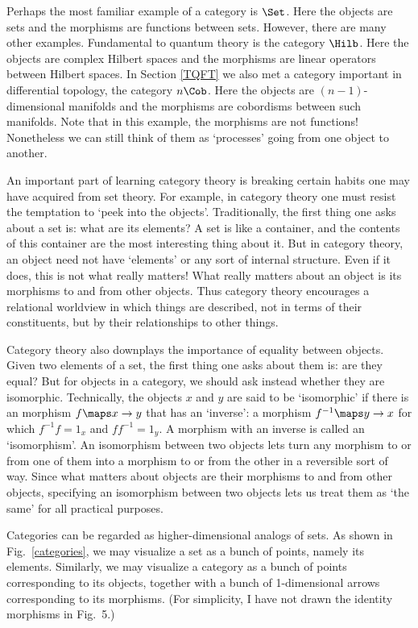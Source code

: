 Perhaps the most familiar example of a category is $\Set$.  Here the
objects are sets and the morphisms are functions between sets.  
However, there are many other examples.  Fundamental to quantum theory
is the category $\Hilb$.  Here the objects are complex Hilbert spaces
and the morphisms are linear operators between Hilbert spaces.  In
Section \ref{TQFT} we also met a category important in differential
topology, the category $n\Cob$.  Here the objects are
$(n-1)$-dimensional manifolds and the morphisms are cobordisms between
such manifolds.  Note that in this example, the morphisms are not
functions!  Nonetheless we can still think of them as `processes' going
from one object to another.  

An important part of learning category theory is breaking certain habits
one may have acquired from set theory.  For example, in category theory
one must resist the temptation to `peek into the objects'.   Traditionally, 
the first thing one asks about a set is: what are its elements?  A set
is like a container, and the contents of this container are the most
interesting thing about it.   But in category theory, an object need not
have `elements' or any sort of internal structure.  Even if it does,
this is not what really matters!   What really matters about an object
is its morphisms to and from other objects.   Thus category theory
encourages a relational worldview in which things are described, not in
terms of their constituents, but by their relationships to other things.
 
Category theory also downplays the importance of equality between
objects.  Given two elements of a set, the first thing one asks about
them is: are they equal?  But for objects in a category, we should ask
instead whether they are isomorphic.  Technically, the objects $x$ and
$y$ are said to be `isomorphic' if there is an morphism $f \maps x \to
y$ that has an `inverse': a morphism $f^{-1} \maps y \to x$ for which
$f^{-1}f = 1_x$ and $ff^{-1} = 1_y$.  A morphism with an inverse is
called an `isomorphism'.  An isomorphism between two objects lets turn
any morphism to or from one of them into a morphism to or from the other
in a reversible sort of way.  Since what matters about objects are their
morphisms to and from other objects, specifying an isomorphism between
two objects lets us treat them as `the same' for all practical purposes.

Categories can be regarded as higher-dimensional analogs of sets.  As
shown in Fig.\ \ref{categories}, we may visualize a set as a bunch of
points, namely its elements.  Similarly, we may visualize a category as
a bunch of points corresponding to its objects, together with a bunch of
1-dimensional arrows corresponding to its morphisms.  (For simplicity, I
have not drawn the identity morphisms in Fig.\ 5.)


